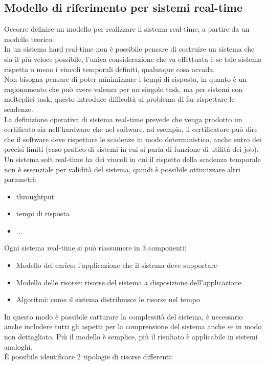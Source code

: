 \documentclass[12pt, oneside]{extbook}
\begin{document}
\subsection{Modello di riferimento per sistemi real-time}
Occorre definire un modello per realizzare il sistema real-time, a partire da un modello teorico.\\ In  un sistema hard real-time non è possibile pensare di costruire un sistema che sia il più veloce possibile, l'unica considerazione che va effettuata è se tale sistema rispetta o meno i vincoli temporali definiti, qualunque cosa accada.\\ Non bisogna pensare di poter minimizzare i tempi di risposta, in quanto è un ragionamento che può avere valenza per un singolo task, ma per sistemi con molteplici task, questo introduce difficoltà al problema di far rispettare le scadenze.\\ La definizione operativa di sistema real-time prevede che venga prodotto un certificato sia nell'hardware che nel software. ad esempio, il certificatore può dire che il software deve rispettare le scadenze in modo deterministico, anche entro dei precisi limiti (caso pratico di sistemi in cui si parla di funzione di utilità dei job).\\ Un sistema soft real-time ha dei vincoli in cui il rispetto della scadenza temporale non è essenziale per validità del sistema, quindi è possibile ottimizzare altri parametri:
\begin{itemize}
\item throughtput
\item tempi di risposta
\item ...
\end{itemize} 
Ogni sistema real-time si può riassumere in 3 componenti:
\begin{itemize}
\item Modello del carico: l'applicazione che il sistema deve supportare
\item Modello delle risorse: risorse del sistema a disposizione dell'applicazione
\item Algoritmi: come il sistema distribuisce le risorse nel tempo
\end{itemize}
In questo modo è possibile catturare la complessità del sistema, è necessario anche includere tutti gli aspetti per la comprensione del sistema anche se in modo non dettagliato. Più il modello è semplice, più il risultato è applicabile in sistemi analoghi.\\ È possibile identificare 2 tipologie di risorse differenti:
\end{document}
